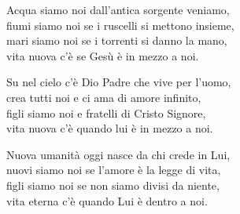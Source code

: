 
\strofa Acqua siamo noi dall'antica sorgente veniamo,\\
fiumi siamo noi se i ruscelli si mettono insieme,\\
mari siamo noi se i torrenti si danno la mano,\\
vita nuova c'è se Gesù è in mezzo a noi.

\spazio


\spazio

\strofa Su nel cielo c'è Dio Padre che vive per l'uomo,\\
crea tutti noi e ci ama di amore infinito,\\
figli siamo noi e fratelli di Cristo Signore,\\
vita nuova c'è quando lui è in mezzo a noi.

\spazio


\spazio

Nuova umanità oggi nasce da chi crede in Lui,\\
nuovi siamo noi se l'amore è la legge di vita,\\
figli siamo noi se non siamo divisi da niente,\\
vita eterna c'è quando Lui è dentro a noi.

\spazio


